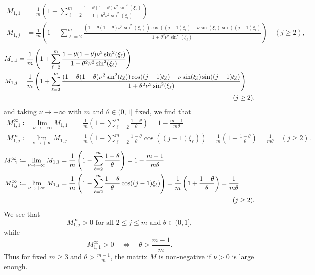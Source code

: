 \documentclass[smallextended,numbook,runningheads]{svjour3}     %
\newcommand{\te}{\theta}
\begin{document}
\begin{description}[style=unboxed,leftmargin=0cm]
\ifarxiv
\begin{align*}
	M_{1,1} & = \frac{1}{m} \left(1 + \sum_{\ell=2}^{m} \frac{1-\theta(1-\theta)\nu^2\sin^2(\xi_\ell)}
		{1+\theta^2\nu^2\sin^2(\xi_\ell)}\right) \\
	M_{1,j} & = \frac{1}{m} \left(1 + \sum_{\ell=2}^{m} \frac{(1-\theta(1-\theta)\nu^2\sin^2(\xi_\ell))
		\cos((j-1)\xi_\ell) + \nu \sin(\xi_\ell)\sin((j-1)\xi_\ell)}{1+\theta^2\nu^2 \sin^2(\xi_\ell)}
		\right) \quad (j\ge 2),
\end{align*}
\else
\begin{align*}
	M_{1,1} & = \frac{1}{m} \left(1 + \sum_{\ell=2}^{m} \frac{1-\theta(1-\theta)\nu^2\sin^2(\xi_\ell)}
		{1+\theta^2\nu^2\sin^2(\xi_\ell)}\right) \\
	M_{1,j} & = \frac{1}{m} \left(1 + \sum_{\ell=2}^{m} \frac{(1-\theta(1-\theta)\nu^2\sin^2(\xi_\ell))
		\cos((j-1)\xi_\ell) + \nu \sin(\xi_\ell)\sin((j-1)\xi_\ell)}{1+\theta^2\nu^2 \sin^2(\xi_\ell)}
		\right) \\ && \hspace*{-30pt} (j \ge 2).
\end{align*}
\fi
and taking $\nu \to +\infty$ with $m$ and $\te\in(0,1]$ fixed, we find that
\ifarxiv
\begin{align*}
    M_{1,1}^\infty \coloneqq \lim_{\nu \to +\infty} M_{1,1} & = \frac{1}{m} \left(1 - \sum_{\ell=2}^m \frac{1-\theta}{\theta}\right) =  1-\frac{m-1}{m\theta} \\
    M_{1,j}^\infty \coloneqq \lim_{\nu \to +\infty} M_{1,j} & = \frac{1}{m} \left(1 - \sum_{\ell=2}^m \frac{1-\theta}{\theta}\cos((j-1)\xi_\ell)\right) = \frac{1}{m} \left(1+\frac{1-\theta}{\theta}\right) = \frac{1}{m\theta} \quad (j \ge 2).
\end{align*}
\else
\begin{align*}
    M_{1,1}^\infty \coloneqq \lim_{\nu \to +\infty} M_{1,1} & = \frac{1}{m} \left(1 - \sum_{\ell=2}^m \frac{1-\theta}{\theta}\right) =  1-\frac{m-1}{m\theta} \\
    M_{1,j}^\infty \coloneqq \lim_{\nu \to +\infty} M_{1,j} & = \frac{1}{m} \left(1 - \sum_{\ell=2}^m \frac{1-\theta}{\theta}\cos((j-1)\xi_\ell)\right) = \frac{1}{m} \left(1+\frac{1-\theta}{\theta}\right) = \frac{1}{m\theta} \\ && \hspace*{-20pt} (j \ge 2).
\end{align*}
\fi
We see that
\[M_{1,j}^\infty>0 \text{ for all } 2\le j\le m \text{ and } \te\in(0,1],
\]
 while 
\[M_{1,1}^\infty>0 \quad\Longleftrightarrow\quad \theta>\frac{m-1}{m}.
\]
Thus for fixed $m\ge 3$ and $\theta>\frac{m-1}{m}$, the matrix $M$ is non-negative 
if $\nu>0$ is large enough.


\end{description}
\end{document}
